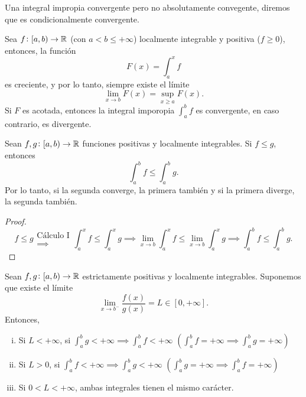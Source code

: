 \begin{defi}
    Una integral impropia convergente pero no absolutamente convegente, diremos que
    es condicionalmente convergente.
\end{defi}

\begin{prop}
    Sea $f \colon [a,b) \to \mathbb{R}$ (con $a < b \leq +\infty$) localmente integrable
    y positiva ($f \geq 0$), entonces, la función
    \[
        F(x) = \int^x_a f
    \]
    es creciente, y por lo tanto, siempre existe el límite
    \[
        \lim_{x \to b} F(x) = \sup_{x \geq a} F(x).
    \]
    Si $F$ es acotada, entonces la integral imporopia $\int^b_a f$ es convergente,
    en caso contrario, es divergente.
\end{prop}

\begin{prop}
    Sean $f,g \colon [a,b) \to \mathbb{R}$ funciones positivas y localmente integrables.
    Si $f \leq g$, entonces
    \[
        \int^b_a f \leq \int^b_a g.
    \]
    Por lo tanto, si la segunda converge, la primera tambi\'en y si la primera 
    diverge, la segunda tambi\'en.
\end{prop}
\begin{proof}
    \[
        f \leq g \substack{\text{Cálculo I} \\ \implies}
        \int^x_a f \leq \int^x_a g \implies \lim_{x \to b} \int^x_a f \leq
        \lim_{x \to b} \int^x_a g \implies \int^b_a f \leq \int^b_a g.
    \]
\end{proof}

\begin{prop}
    Sean $f,g \colon [a,b) \to \mathbb{R}$ estrictamente positivas y localmente
    integrables. Suponemos que existe el límite
    \[
        \lim_{x \to b^-} \frac{f(x)}{g(x)} = L \in [0,+\infty].
    \]
    Entonces, \begin{enumerate}[i)]
        \item\label{item:comp_lim_int_1}
            Si $L < +\infty$, si $\int^b_a g < +\infty \implies \int^b_af <
            +\infty$ $\left( \int^b_a f = +\infty \implies \int^b_a g =
            +\infty\right)$
        \item\label{item:comp_lim_int_2}
            Si $L > 0$, si $\int^b_a f < +\infty \implies \int^b_a g <
            +\infty$ $\left(\int^b_a g = +\infty \implies \int^b_a f =
            +\infty\right)$
        \item Si $0 < L < +\infty$, ambas integrales tienen el mismo carácter.
    \end{enumerate}
\end{prop}

